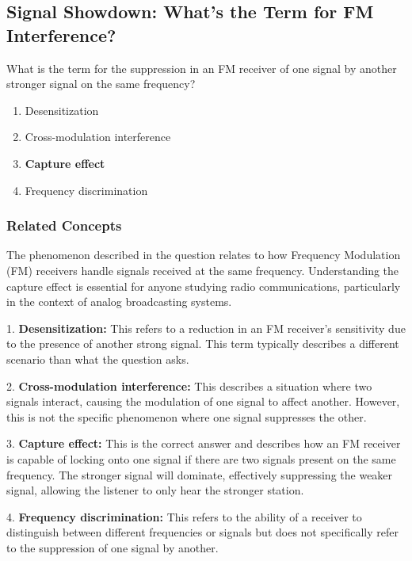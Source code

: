 \subsection{Signal Showdown: What's the Term for FM Interference?}

\begin{tcolorbox}[colback=gray!10, colframe=black, title=E4C03]
What is the term for the suppression in an FM receiver of one signal by another stronger signal on the same frequency?
\begin{enumerate}[label=\Alph*.]
    \item Desensitization
    \item Cross-modulation interference
    \item \textbf{Capture effect}
    \item Frequency discrimination
\end{enumerate} \end{tcolorbox}

\subsubsection{Related Concepts}

The phenomenon described in the question relates to how Frequency Modulation (FM) receivers handle signals received at the same frequency. Understanding the capture effect is essential for anyone studying radio communications, particularly in the context of analog broadcasting systems. 

1. \textbf{Desensitization:} This refers to a reduction in an FM receiver’s sensitivity due to the presence of another strong signal. This term typically describes a different scenario than what the question asks.

2. \textbf{Cross-modulation interference:} This describes a situation where two signals interact, causing the modulation of one signal to affect another. However, this is not the specific phenomenon where one signal suppresses the other.

3. \textbf{Capture effect:} This is the correct answer and describes how an FM receiver is capable of locking onto one signal if there are two signals present on the same frequency. The stronger signal will dominate, effectively suppressing the weaker signal, allowing the listener to only hear the stronger station.

4. \textbf{Frequency discrimination:} This refers to the ability of a receiver to distinguish between different frequencies or signals but does not specifically refer to the suppression of one signal by another.

